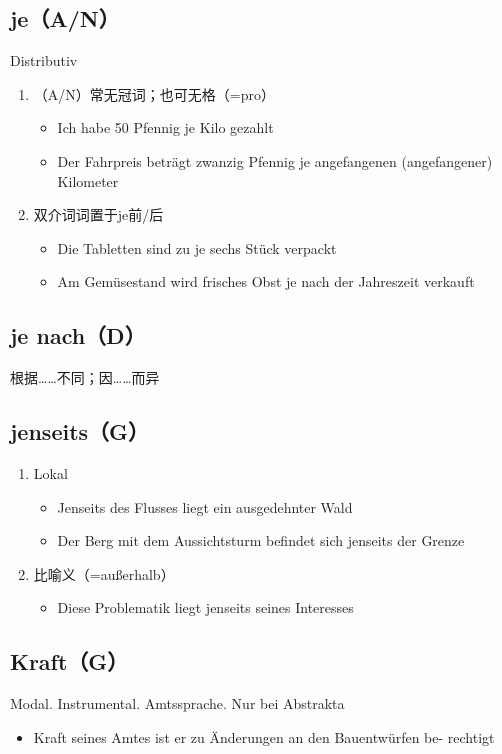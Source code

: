 \documentclass[UTF8]{report}
\begin{document}
\subsection{je（A/N）}
Distributiv
\begin{enumerate}
    \item （A/N）常无冠词；也可无格（=pro）
    \begin{itemize}
        \item Ich habe 50 Pfennig je Kilo gezahlt
        \item Der Fahrpreis beträgt zwanzig Pfennig je angefangenen (angefangener) Kilometer
    \end{itemize}
    \item 双介词词置于je前/后
    \begin{itemize}
        \item Die Tabletten sind zu je sechs Stück verpackt
        \item Am Gemüsestand wird frisches Obst je nach der Jahreszeit verkauft
    \end{itemize}
\end{enumerate}

\subsection{je nach（D）}
根据……不同；因……而异

\subsection{jenseits（G）}
\begin{enumerate}
    \item Lokal
    \begin{itemize}
        \item Jenseits des Flusses liegt ein ausgedehnter Wald
        \item Der Berg mit dem Aussichtsturm befindet sich jenseits der Grenze
    \end{itemize}
    \item 比喻义（=außerhalb）
    \begin{itemize}
        \item Diese Problematik liegt jenseits seines Interesses
    \end{itemize}
\end{enumerate}


\subsection{Kraft（G）}
Modal. Instrumental. Amtssprache. Nur bei Abstrakta
\begin{itemize}
    \item Kraft seines Amtes ist er zu Änderungen an den Bauentwürfen be- rechtigt
\end{itemize}
\end{document}
